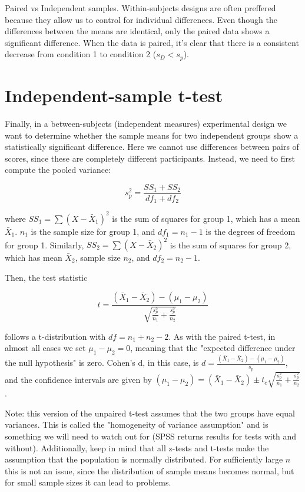 \documentclass{tufte-handout}
\begin{document}
\begin{marginfigure}
  \label{fig:fullfig}%
  \caption{Paired vs Independent samples. Within-subjects designs are often preffered because they allow us to control for individual differences. Even though the differences between the means are identical, only the paired data shows a significant difference. When the data is paired, it's clear that there is a consistent decrease from condition 1 to condition 2 ($s_D<s_p$).}
\end{marginfigure}

\section{Independent-sample t-test}

Finally, in a between-subjects (independent measures) experimental design we want to determine whether the sample means for two independent groups show a statistically significant difference. Here we cannot use differences between pairs of scores, since these are completely different participants. Instead, we need to first compute the pooled variance:
 
\begin{equation*}
s_p^2=\frac{SS_1+SS_2}{df_1+df_2}
\end{equation*}

where $SS_1=\sum{(X-\bar{X}_1)^2}$ is the sum of squares for group 1, which has a mean $\bar{X}_1$. $n_1$  is the sample size for group 1, and $df_1=n_1-1$  is the degrees of freedom for group 1. Similarly, $SS_2=\sum{(X-\bar{X}_2)^2}$  is the sum of squares for group 2, which has mean $\bar{X}_2$, sample size $n_2$, and $df_2=n_2-1$.

Then, the test statistic 

\begin{equation*}
t=\frac{(\bar{X}_1-\bar{X}_2)-(\mu_1-\mu_2)}{\sqrt{\frac{s_p^2}{n_1}+\frac{s_p^2}{n_2}}}
\end{equation*}

follows a t-distribution with $df=n_1+n_2-2$. As with the paired t-test, in almost all cases we set $\mu_1-\mu_2 = 0$, meaning that the "expected difference under the null hypothesis" is zero. Cohen's d, in this case, is $d=\frac{(\bar{X}_1-\bar{X}_2)-(\mu_1-\mu_2)}{s_p}$, and the confidence intervals are given by $(\mu_1-\mu_2)=(\bar{X}_1-\bar{X}_2) \pm t_c \sqrt{\frac{s_p^2}{n_1}+\frac{s_p^2}{n_2}}$.

Note: this version of the unpaired t-test assumes that the two groups have equal variances. This is called the "homogeneity of variance assumption" and is something we will need to watch out for (SPSS returns results for tests with and without). Additionally, keep in mind that all z-tests and t-tests make the assumption that the population is normally distributed. For sufficiently large $n$ this is not an issue, since the distribution of sample means becomes normal, but for small sample sizes it can lead to problems.
\end{document}
